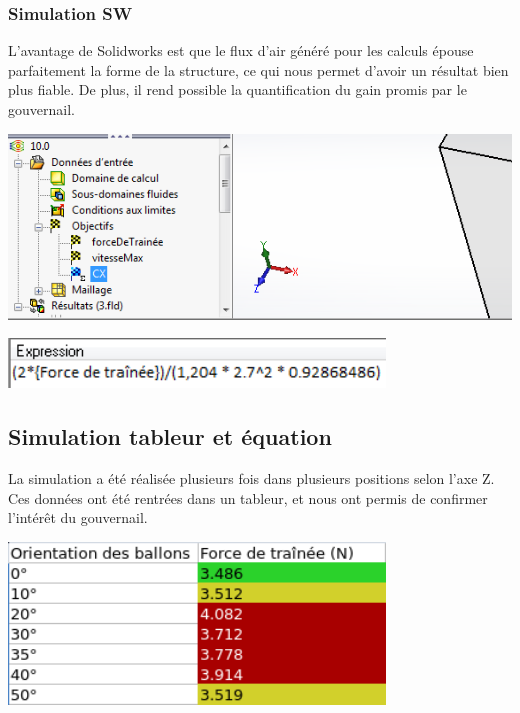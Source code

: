 \documentclass[a4paper,11pt]{article}
\begin{document}
\subsubsection{Simulation SW}
	L'avantage de Solidworks est que le flux d'air généré pour les calculs épouse parfaitement la forme de la structure, ce qui nous permet d'avoir un résultat bien plus fiable. De plus, il rend possible la quantification du gain promis par le gouvernail.\\
	\begin{center}
		\includegraphics[width=15cm]{../Images/objectifsSW.png}
	\end{center}
	\begin{center}
		\includegraphics[width=10cm]{../Images/expressionCX.png}
	\end{center}

\subsection{Simulation tableur et équation}
	La simulation a été réalisée plusieurs fois dans plusieurs positions selon l'axe Z.\\
	Ces données ont été rentrées dans un tableur, et nous ont permis de confirmer l'intérêt du gouvernail.\\
	\begin{center}
    \includegraphics[width=10cm]{../Images/resultatsSW.png} \\
	\end{center}
\end{document}
